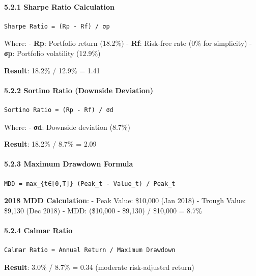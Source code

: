 \paragraph{5.2.1 Sharpe Ratio
Calculation}\label{sharpe-ratio-calculation}

\begin{verbatim}
Sharpe Ratio = (Rp - Rf) / σp
\end{verbatim}

Where: - \textbf{Rp}: Portfolio return (18.2\%) - \textbf{Rf}: Risk-free
rate (0\% for simplicity) - \textbf{σp}: Portfolio volatility (12.9\%)

\textbf{Result}: 18.2\% / 12.9\% = 1.41

\paragraph{5.2.2 Sortino Ratio (Downside
Deviation)}\label{sortino-ratio-downside-deviation}

\begin{verbatim}
Sortino Ratio = (Rp - Rf) / σd
\end{verbatim}

Where: - \textbf{σd}: Downside deviation (8.7\%)

\textbf{Result}: 18.2\% / 8.7\% = 2.09

\paragraph{5.2.3 Maximum Drawdown
Formula}\label{maximum-drawdown-formula}

\begin{verbatim}
MDD = max_{t∈[0,T]} (Peak_t - Value_t) / Peak_t
\end{verbatim}

\textbf{2018 MDD Calculation}: - Peak Value: \$10,000 (Jan 2018) -
Trough Value: \$9,130 (Dec 2018) - MDD: (\$10,000 - \$9,130) / \$10,000
= 8.7\%

\paragraph{5.2.4 Calmar Ratio}\label{calmar-ratio}

\begin{verbatim}
Calmar Ratio = Annual Return / Maximum Drawdown
\end{verbatim}

\textbf{Result}: 3.0\% / 8.7\% = 0.34 (moderate risk-adjusted return)

